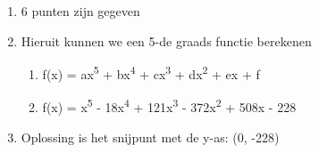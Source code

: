\begin{enumerate}
  \item 6 punten zijn gegeven
  \item Hieruit kunnen we een 5-de graads functie berekenen
  \begin{enumerate}
  \item f(x) = ax\textsuperscript{5} + bx\textsuperscript{4} + cx\textsuperscript{3} + dx\textsuperscript{2} + ex + f
  \item f(x) = x\textsuperscript{5} - 18x\textsuperscript{4} + 121x\textsuperscript{3} - 372x\textsuperscript{2} + 508x - 228
  \end{enumerate}
  \item Oplossing is het snijpunt met de y-as: (0, -228)
\end{enumerate}